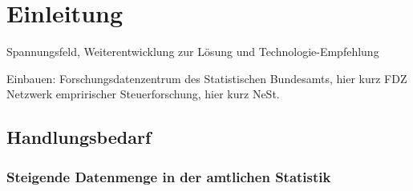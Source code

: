 \documentclass[
  german,
  10pt,
  twoside]{article}
\begin{document}
\clearpage
\twocolumn

\section{Einleitung}\label{sec-einleitung}

Spannungsfeld, Weiterentwicklung zur Lösung und Technologie-Empfehlung

Einbauen: Forschungsdatenzentrum des Statistischen Bundesamts, hier kurz
FDZ Netzwerk empririscher Steuerforschung, hier kurz NeSt.

\subsection{Handlungsbedarf}\label{handlungsbedarf}

\subsubsection{Steigende Datenmenge in der amtlichen
Statistik}\label{steigende-datenmenge-in-der-amtlichen-statistik}
\end{document}
